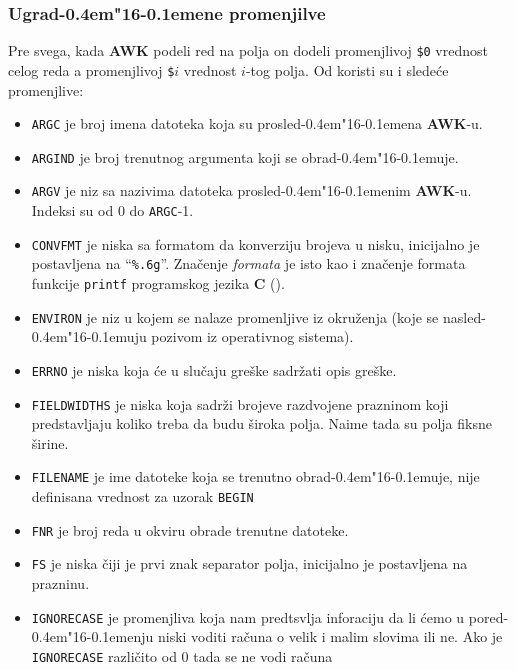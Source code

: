\documentclass[12pt,a4paper]{article}
\def\d{d\kern-0.4em\char"16\kern-0.1em}
\begin{document}
      \subsubsection{Ugra\d ene promenjilve}
        \label{sub:awkpromenjlive}
        Pre svega, kada {\bf AWK} podeli red na polja on dodeli promenjlivoj
        {\tt\$0} vrednost celog reda a promenjlivoj {\tt\$$i$} vrednost
        $i$-tog polja.
        Od koristi su i slede\'ce promenjlive:
        \begin{itemize}
        \item
          {\tt ARGC} je broj imena datoteka koja su prosle\d ena {\bf AWK}-u.
        \item
          {\tt ARGIND} je broj trenutnog argumenta koji se obra\d uje.
        \item
          {\tt ARGV} je niz sa nazivima datoteka prosle\d enim {\bf AWK}-u.
          Indeksi su od 0 do {\tt ARGC}-1.
        \item
          {\tt CONVFMT} je niska sa formatom da konverziju brojeva u nisku,
          inicijalno je postavljena na ``{\tt\%.6g}''.
          Zna\v cenje {\it formata} je isto kao i zna\v cenje for\-mata
          funkcije {\tt printf} programskog jezika {\bf C} (\cite{KR,AWK}).
        \item
          {\tt ENVIRON} je niz u kojem se nalaze promenljive iz okru\v zenja
          (koje se nasle\d uju pozivom iz operativnog sistema).
        \item
          {\tt ERRNO} je niska koja \'ce u slu\v caju gre\v ske sadr\v zati
          opis gre\v ske.
        \item
          {\tt FIELDWIDTHS} je niska koja sadr\v zi brojeve razdvojene
          prazninom koji predstavljaju koliko treba da budu \v siroka polja.
          Naime tada su polja fiksne \v sirine.
        \item
          {\tt FILENAME} je ime datoteke koja se trenutno obra\d uje, nije
          definisana vrednost za uzorak {\tt BEGIN}
        \item
          {\tt FNR} je broj reda u okviru obrade trenutne datoteke.
        \item
          {\tt FS} je niska \v ciji je prvi znak separator polja, inicijalno
          je postavljena na prazninu.
        \item
          {\tt IGNORECASE} je promenjliva koja nam predtsvlja inforaciju da li
          \'cemo u pore\d enju niski voditi ra\v cuna o velik i malim slovima
          ili ne.
          Ako je {\tt IGNORECASE} razli\v cito od 0 tada se ne vodi ra\v cuna

\end{itemize}
\end{document}
